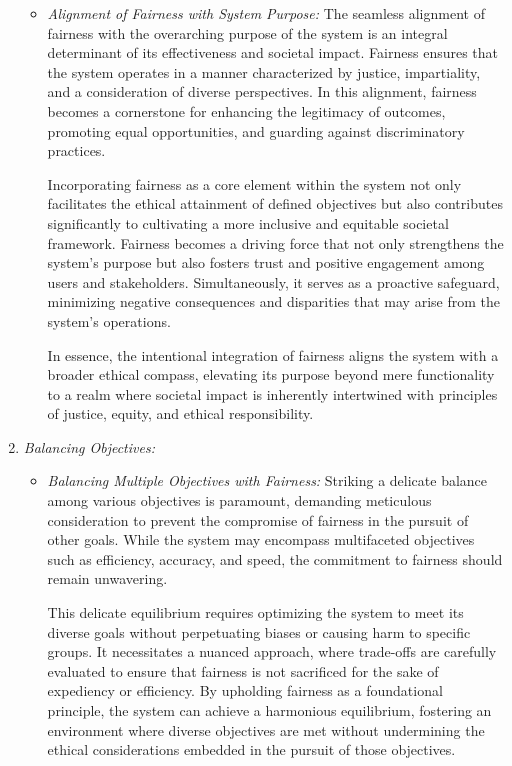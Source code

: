 \documentclass[12pt,a4paper,openright,twoside]{book}
\begin{document}
\begin{enumerate}
\begin{itemize}
            \item \emph{Alignment of Fairness with System Purpose:} The seamless alignment of fairness with the overarching purpose of the system is an integral determinant of its effectiveness and societal impact. Fairness ensures that the system operates in a manner characterized by justice, impartiality, and a consideration of diverse perspectives. In this alignment, fairness becomes a cornerstone for enhancing the legitimacy of outcomes, promoting equal opportunities, and guarding against discriminatory practices.

            Incorporating fairness as a core element within the system not only facilitates the ethical attainment of defined objectives but also contributes significantly to cultivating a more inclusive and equitable societal framework. Fairness becomes a driving force that not only strengthens the system's purpose but also fosters trust and positive engagement among users and stakeholders. Simultaneously, it serves as a proactive safeguard, minimizing negative consequences and disparities that may arise from the system's operations.
            
            In essence, the intentional integration of fairness aligns the system with a broader ethical compass, elevating its purpose beyond mere functionality to a realm where societal impact is inherently intertwined with principles of justice, equity, and ethical responsibility.

        \end{itemize}
    
    \item \emph{Balancing Objectives:}

        \begin{itemize}
            
            \item \emph{Balancing Multiple Objectives with Fairness:} Striking a delicate balance among various objectives is paramount, demanding meticulous consideration to prevent the compromise of fairness in the pursuit of other goals. While the system may encompass multifaceted objectives such as efficiency, accuracy, and speed, the commitment to fairness should remain unwavering.

            This delicate equilibrium requires optimizing the system to meet its diverse goals without perpetuating biases or causing harm to specific groups. It necessitates a nuanced approach, where trade-offs are carefully evaluated to ensure that fairness is not sacrificed for the sake of expediency or efficiency. By upholding fairness as a foundational principle, the system can achieve a harmonious equilibrium, fostering an environment where diverse objectives are met without undermining the ethical considerations embedded in the pursuit of those objectives.


\end{itemize}
\end{enumerate}
\end{document}
